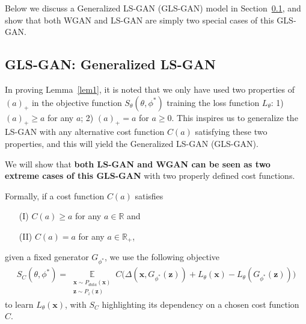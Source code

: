 Below we discuss a Generalized LS-GAN (GLS-GAN) model in Section~\ref{sec:glsgan}, and show that both WGAN and LS-GAN are simply two special cases of this GLS-GAN.


\subsection{GLS-GAN: Generalized LS-GAN}\label{sec:glsgan}

In proving Lemma~\ref{lem1}, it is noted that we only have used two properties of $(a)_+$ in the objective function $S_\theta(\theta,\phi^*)$ training the loss function $L_\theta$: 1) $(a)_+ \geq a$ for any $a$; 2) $(a)_+=a$ for $a\geq 0$. This inspires us to generalize the LS-GAN with any alternative cost function $C(a)$ satisfying these two properties, and this will yield the Generalized LS-GAN (GLS-GAN).

We will show that {\bf both LS-GAN and WGAN can be seen as two extreme cases of this GLS-GAN } with two properly defined cost functions.

Formally, if a cost function $C(a)$ satisfies
\begin{itemize}
\item[(I)] $C(a)\geq a$ for any $a\in\mathbb R$ and
\item[(II)] $C(a) = a$ for any $a\in\mathbb R_+$,
\end{itemize}
given a fixed generator $G_{\phi^*}$, we use the following objective
\begin{align}\label{eq:glsgan}
S_C(\theta,\phi^*)=
 \mathop \mathbb E\limits_{\substack{\mathbf x\sim P_{data}(\mathbf x) \\ \mathbf z\sim P_{z}(\mathbf z)}}C\big( \Delta(\mathbf x, G_{\phi^*}(\mathbf z)) + L_\theta(\mathbf x) - L_\theta(G_{\phi^*}(\mathbf z)) \big)\nonumber
\end{align}
to learn $L_\theta(\mathbf x)$, with $S_C$ highlighting its dependency on a chosen cost function $C$.

